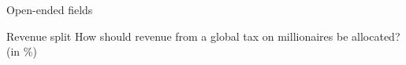 \documentclass[aspectratio=169,xcolor=dvipsnames, 11pt,mathserif]{beamer}
\begin{document}
\begin{frame}{Open-ended fields}
\end{frame}

\begin{frame}{Revenue split}
\centering How should revenue from a global tax on millionaires be allocated? (in \%) %
\end{frame}

\end{document}

